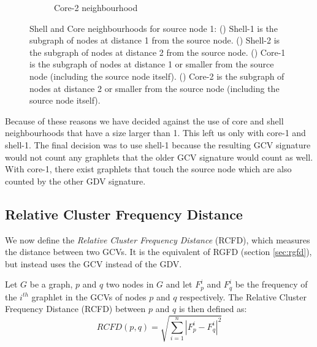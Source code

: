 \begin{figure}[H]
\begin{subfigure}[b]{0.45\textwidth}
\begin{tikzpicture}[scale=1.2,auto,swap]
    \end{tikzpicture}
    \caption{Core-2 neighbourhood} 
    \label{fig:core2}
  \end{subfigure}
\caption[Shell and Core neighbourhoods]{Shell and Core neighbourhoods for source node 1: () Shell-1 is the subgraph of nodes at distance 1 from the source node. () Shell-2 is the subgraph of nodes at distance 2 from the source node. () Core-1 is the subgraph of nodes at distance 1 or smaller from the source node (including the source node itself). () Core-2 is the subgraph of nodes at distance 2 or smaller from the source node (including the source node itself).}
\label{fig:shell_core}
\end{figure}

Because of these reasons we have decided against the use of core and shell neighbourhoods that have a size larger than 1. This left us only with core-1 and shell-1. The final decision was to use shell-1 because the resulting GCV signature would not count any graphlets that the older GCV signature would count as well. With core-1, there exist graphlets that touch the source node which are also counted by the other GDV signature. 

\subsection{Relative Cluster Frequency Distance}
\label{rcfd}

We now define the \emph{Relative Cluster Frequency Distance} (RCFD), which measures the distance between two GCVs. It is the equivalent of RGFD (section \ref{sec:rgfd}), but instead uses the GCV instead of the GDV.

\begin{mydef}
 Let $G$ be a graph, $p$ and $q$ two nodes in $G$ and let \(F_p^i\)
and \(F_q^i\) be the frequency of the $i^{th}$ graphlet in the GCVs of nodes $p$ and $q$ respectively. The Relative Cluster Frequency Distance (RCFD) between $p$ and $q$ is then defined as:
\begin{equation}
 RCFD(p,q) = \sqrt{\sum_{i=1}^{n}| F_p^i - F_q^i |^2}
\end{equation}
\end{mydef}

